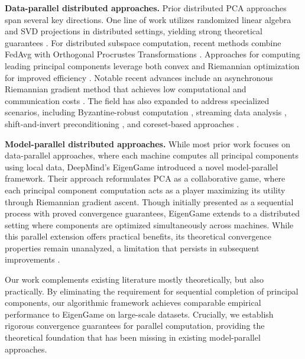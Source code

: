 \noindent \textbf{Data-parallel distributed approaches.}
Prior distributed PCA approaches span several key directions. One line of work utilizes randomized linear algebra and SVD projections in distributed settings, yielding strong theoretical guarantees \cite{kannan2014principal, liang2014improved, boutsidis2016optimal, fan2019distributed}. For distributed subspace computation, recent methods combine FedAvg with Orthogonal Procrustes Transformations \cite{li2021communication,mcmahan2017communication,schonemann1966generalized, cape2020orthogonal}. Approaches for computing leading principal components leverage both convex \cite{garber2017communication} and Riemannian optimization for improved efficiency \cite{huang2020communication,alimisis2021distributed}. Notable recent advances include an asynchronous Riemannian gradient method that achieves low computational and communication costs \cite{wang2023incremental}. The field has also expanded to address specialized scenarios, including Byzantine-robust computation \cite{charisopoulos2022communication, zari2022membership}, streaming data analysis \cite{allen2017first, yu2017single}, shift-and-invert preconditioning \cite{garber2016faster}, and coreset-based approaches \cite{feldman2020turning}.

\textbf{Model-parallel distributed approaches.} While most prior work focuses on data-parallel approaches, where each machine computes all principal components using local data, DeepMind's EigenGame \cite{gemp_2020_eigengame} introduced a novel model-parallel framework. Their approach reformulates PCA as a collaborative game, where each principal component computation acts as a player maximizing its utility through Riemannian gradient ascent. Though initially presented as a sequential process with proved convergence guarantees, EigenGame extends to a distributed setting where components are optimized simultaneously across machines. While this parallel extension offers practical benefits, its theoretical convergence properties remain unanalyzed, a limitation that persists in subsequent improvements \cite{gemp2022eigengame}.

Our work complements existing literature mostly theoretically, but also practically. By eliminating the requirement for sequential completion of principal components, our algorithmic framework achieves comparable empirical performance to EigenGame \cite{gemp_2020_eigengame} on large-scale datasets. Crucially, we establish rigorous convergence guarantees for parallel computation, providing the theoretical foundation that has been missing in existing model-parallel approaches.

\vspace{-0.1cm}